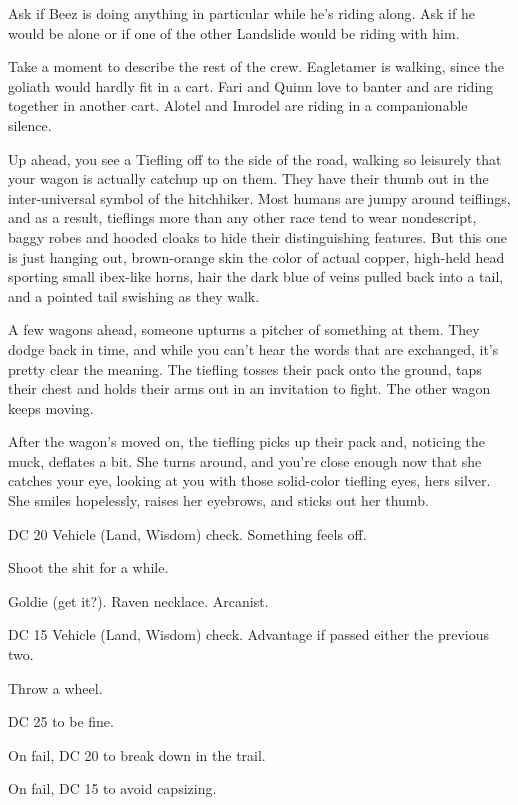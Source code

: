 \begin{multicols}{2}
Ask if Beez is doing anything in particular while he's riding along.
Ask if he would be alone or if one of the other Landslide would be riding with him.

Take a moment to describe the rest of the crew.
Eagletamer is walking, since the goliath would hardly fit in a cart.
Fari and Quinn love to banter and are riding together in another cart.
Alotel and Imrodel are riding in a companionable silence.

  \begin{aloud}
  Up ahead, you see a Tiefling off to the side of the road,
    walking so leisurely that your wagon is actually catchup up on them.
  They have their thumb out in the inter-universal symbol of the hitchhiker.
  Most humans are jumpy around teiflings, and as a result, tieflings more than any other race tend
    to wear nondescript, baggy robes and hooded cloaks to hide their distinguishing features.
  But this one is just hanging out, brown-orange skin the color of actual copper,
    high-held head sporting small ibex-like horns,
    hair the dark blue of veins pulled back into a tail,
    and a pointed tail swishing as they walk.

  A few wagons ahead, someone upturns a pitcher of something at them.
  They dodge back in time, and while you can't hear the words that are exchanged, it's pretty clear
    the meaning.
  The tiefling tosses their pack onto the ground, taps their chest and holds their arms out in
    an invitation to fight.
  The other wagon keeps moving.

  After the wagon's moved on, the tiefling picks up their pack and, noticing the muck, deflates
    a bit.
  She turns around, and you're close enough now that she catches your eye, looking at you with
    those solid-color tiefling eyes, hers silver.
  She smiles hopelessly, raises her eyebrows, and sticks out her thumb.
  \end{aloud}

DC 20 Vehicle (Land, Wisdom) check.
Something feels off.

Shoot the shit for a while.

Goldie (get it?).
Raven necklace.
Arcanist.

DC 15 Vehicle (Land, Wisdom) check.
Advantage if passed either the previous two.

Throw a wheel.

DC 25 to be fine.

On fail, DC 20 to break down in the trail.

On fail, DC 15 to avoid capsizing.


\end{multicols}
